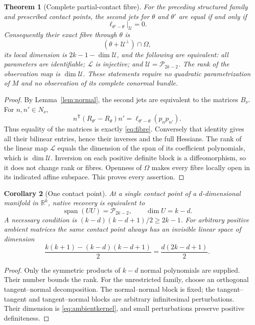 \documentclass[11pt,reqno]{amsart}
\numberwithin{equation}{section}
\newtheorem{theorem}{Theorem}[section]
\newtheorem{corollary}[theorem]{Corollary}
\theoremstyle{definition}\newtheorem{definition}[theorem]{Definition}
\theoremstyle{remark}\newtheorem{remark}[theorem]{Remark}
\newcommand{\R}{\mathbb R}
\newcommand{\Span}{\operatorname{span}}
\newcommand{\cP}{\mathcal P}
\newcommand{\cL}{\mathcal L}
\newcommand{\cU}{\mathcal U}
\begin{document}
\begin{theorem}[Complete partial-contact fibre]\label{thm:products}
For the preceding structured family and prescribed contact points, the second jets for $\theta$ and $\theta'$ are equal if and only if
\begin{equation}\label{eq:fibre}
 \ell_{\theta'-\theta}|_{\cU}=0.
\end{equation}
Consequently their exact fibre through $\theta$ is
\[
 (\theta+\cU^\perp)\cap\Omega,
\]
its local dimension is $2k-1-\dim\cU$, and the following are equivalent: all parameters are identifiable; $\cL$ is injective; and $\cU=\cP_{2k-2}$. The rank of the observation map is $\dim\cU$. These statements require no quadratic parametrization of $M$ and no observation of its complete conormal bundle.
\end{theorem}
\begin{proof}
By Lemma~\ref{lem:normal}, the second jets are equivalent to the matrices $B_\nu$. For $n,n'\in N_\nu$,
\[
 n^{\mathsf T}(R_{\theta'}-R_\theta)n'
   =\ell_{\theta'-\theta}(p_n p_{n'}).
\]
Thus equality of the matrices is exactly \eqref{eq:fibre}. Conversely that identity gives all their bilinear entries, hence their inverses and the full Hessians. The rank of the linear map $\cL$ equals the dimension of the span of its coefficient polynomials, which is $\dim\cU$. Inversion on each positive definite block is a diffeomorphism, so it does not change rank or fibres. Openness of $\Omega$ makes every fibre locally open in its indicated affine subspace. This proves every assertion.
\end{proof}

\begin{corollary}[One contact point]\label{cor:one}
At a single contact point of a $d$-dimensional manifold in $\R^k$, native recovery is equivalent to
\[
 \Span(UU)=\cP_{2k-2},\qquad \dim U=k-d.
\]
A necessary condition is $(k-d)(k-d+1)/2\ge2k-1$. For arbitrary positive ambient matrices the same contact point always has an invisible linear space of dimension
\begin{equation}\label{eq:ambientkernel}
 \frac{k(k+1)-(k-d)(k-d+1)}2=\frac{d(2k-d+1)}2.
\end{equation}
\end{corollary}
\begin{proof}
Only the symmetric products of $k-d$ normal polynomials are supplied. Their number bounds the rank. For the unrestricted family, choose an orthogonal tangent--normal decomposition. The normal--normal block is fixed; the tangent--tangent and tangent--normal blocks are arbitrary infinitesimal perturbations. Their dimension is \eqref{eq:ambientkernel}, and small perturbations preserve positive definiteness.
\end{proof}
\end{document}
